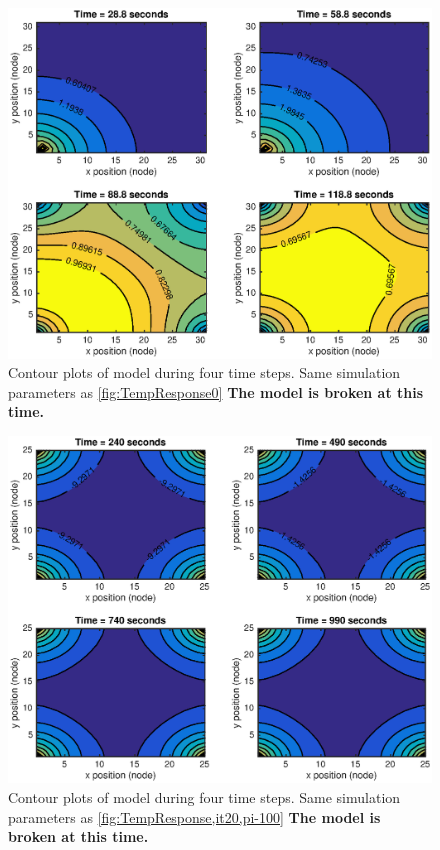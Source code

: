 \documentclass[10pt,twocolumn]{article}
\begin{document}
\begin{figure}
	\center
	\includegraphics[width=0.8\linewidth]{ContourTrans0.eps}
	\caption{Contour plots of model during four time steps. Same simulation parameters as \autoref{fig:TempResponse0} \textbf{The model is broken at this time.}}
	\label{fig:ContourTrans0}
\end{figure}


\begin{figure}
	\center
	\includegraphics[width=0.8\linewidth]{ContourTrans,it20,pi-100.eps}
	\caption{Contour plots of model during four time steps. Same simulation parameters as \autoref{fig:TempResponse,it20,pi-100} \textbf{The model is broken at this time.}}
	\label{fig:ContourTrans,it20,pi-100}
\end{figure}
\end{document}
